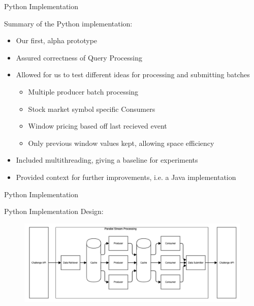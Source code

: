 \documentclass[9pt]{beamer}
\begin{document}
\begin{frame}[fragile]{ Python Implementation }


    Summary of the Python implementation:
    
    \begin{itemize}
        \item Our first, alpha prototype
        \item Assured correctness of Query Processing 
        \item Allowed for us to test different ideas for processing and submitting batches
            \begin{itemize}
                \item Multiple producer batch processing
                \item Stock market symbol specific Consumers
                \item Window pricing based off last recieved event
                \item Only previous window values kept, allowing space efficiency 
            \end{itemize}
        \item Included multithreading, giving a baseline for experiments
        \item Provided context for further improvements, i.e. a Java implementation

    \end{itemize}


    
\end{frame}


\begin{frame}[fragile]{ Python Implementation }


    Python Implementation Design:  

    \begin{figure}
        \begin{center}
            \includegraphics[width=1\textwidth]{./debs_python_v2.png}
        \end{center}
    \end{figure}
   

    
\end{frame}
\end{document}
